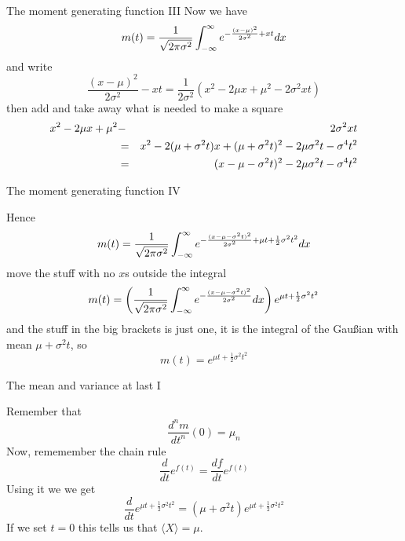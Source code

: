 \documentclass{beamer}
\begin{document}
\begin{frame}{The moment generating function III}
Now we have 
\color{reddish}
$$
m(t)=\frac{1}{\sqrt{2\pi\sigma^2}}\int_{-\infty}^\infty e^{\color{blueish}-\frac{(x-\mu)^2}{2\sigma^2}+xt\color{reddish}}dx
$$
\color{black}
and write
\color{blueish}{}
$$
\frac{(x-\mu)^2}{2\sigma^2}-xt=\frac{1}{2\sigma^2}(x^2-2\mu x +\mu^2-2\sigma^2 xt)
$$
\color{black}
then add and take away what is needed to make a square
\color{blueish}
\begin{eqnarray*}
x^2-2\mu x +\mu^2&-&2\sigma^2 xt\cr
 &=& x^2-2(\mu+\sigma^2 t) x +(\mu+\color{greenish}{}\sigma^2 t\color{blueish}{})^2\color{greenish}{} - 2\mu\sigma^2 t -\sigma^4 t^2\color{blueish}{}\cr
                                &=& (x-\mu-\sigma^2 t)^2 - 2\mu\sigma^2 t -\sigma^4 t^2
\end{eqnarray*}
\color{black}
\end{frame}


\begin{frame}{The moment generating function IV}

Hence
\color{reddish}
$$
m(t)=\frac{1}{\sqrt{2\pi\sigma^2}}\int_{-\infty}^\infty e^{-\frac{(x-\mu-\sigma^2 t)^2}{2\sigma^2}\color{greenish}{}+\mu t + \frac{1}{2}\sigma^2 t^2\color{reddish}}dx
$$
\color{black}
move the \color{greenish}{}stuff with no $x$s\color{black}{} outside the integral\color{reddish}
$$
m(t)=\left(\color{blueish}{}\frac{1}{\sqrt{2\pi\sigma^2}}\int_{-\infty}^\infty e^{-\frac{(x-\mu-\sigma^2 t)^2}{2\sigma^2}}dx\color{reddish}\right)\color{greenish}{} e^{\mu t + \frac{1}{2}\sigma^2 t^2}
$$
\color{black} and the \color{blueish}{}stuff in the big brackets\color{black}{} is just one,  it is the integral of the Gau\ss{}ian with mean \color{reddish}$\mu+\sigma^2 t$\color{black}{}, so
\color{purple}
$$
m(t)= e^{\mu t + \frac{1}{2}\sigma^2 t^2}
$$
\color{black}

\end{frame}

\begin{frame}{The mean and variance at last I}

Remember that 
\color{reddish}
$$
\frac{d^nm}{dt^n}(0)=\mu_n
$$
\color{black}
Now, rememember the chain rule
\color{greenish}{}
$$
\frac{d}{dt}e^{f(t)}=\frac{df}{dt}e^{f(t)}
$$
\color{black}
Using it we we get
\color{greenish}{}
$$
\frac{d}{dt}e^{\mu t + \frac{1}{2}\sigma^2 t^2}=(\mu+\sigma^2 t)e^{\mu t + \frac{1}{2}\sigma^2 t^2}
$$
\color{black}{}
If we set \color{reddish}$t=0$\color{black}{} this tells us that \color{reddish}$\langle X\rangle =\mu$\color{black}{}.


\end{frame}
\end{document}
